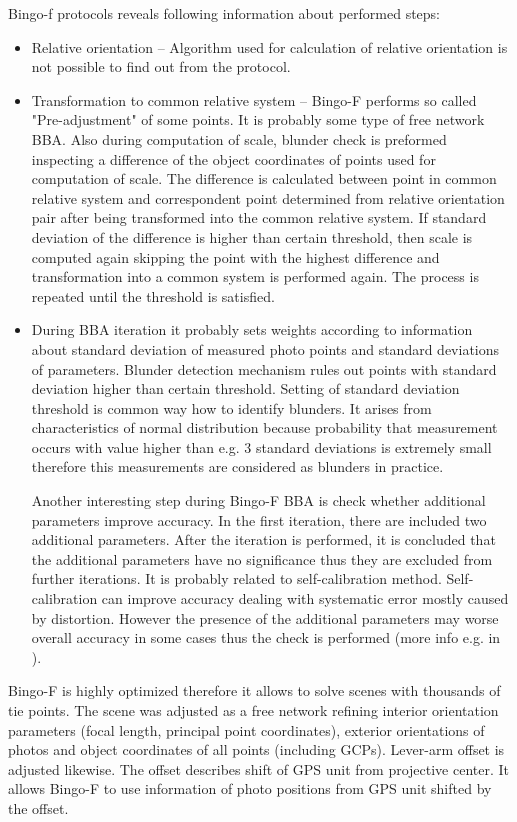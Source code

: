 \documentclass[a4paper,12pt]{article}
\begin{document}
Bingo-f protocols reveals following information about performed steps: 
\begin{itemize}
\item Relative orientation -- Algorithm used for calculation of relative orientation is not possible to find out from the protocol.  
\item Transformation to common relative system -- Bingo-F performs so called "Pre-adjustment" of some points. It is probably some type of free network 
BBA. Also during computation of scale, blunder check is preformed inspecting a difference of the object coordinates of points 
used for computation of scale. The difference is calculated between point in common relative system 
and correspondent point determined from relative orientation pair after being transformed into the common relative system.
If standard deviation of the difference is higher than certain threshold, then 
scale is computed again skipping the point with the highest difference and 
transformation into a common system is performed again.
The process is repeated  until  the threshold is satisfied.
\item During BBA iteration it probably sets weights according to information about standard deviation of measured photo points 
and standard deviations of parameters. 
Blunder detection mechanism rules out points with
standard deviation higher than certain threshold. Setting of standard deviation threshold  is common way how to identify 
blunders. It arises from characteristics of normal distribution because probability that measurement occurs with value 
 higher than e.g. 3 standard deviations is extremely small therefore this measurements are considered as blunders in practice.
 
 Another interesting step during Bingo-F BBA is check whether additional parameters improve accuracy. 
 In the first iteration, there are included two additional parameters. After 
 the iteration is performed, it is concluded that the additional parameters have no significance thus 
 they are excluded from further iterations. It is probably related to self-calibration 
 method. Self-calibration can improve accuracy dealing with systematic error mostly caused by 
 distortion. However the presence of the additional parameters may worse overall accuracy in some cases thus 
  the check is performed (more info e.g. in \cite{precision1980grunn}).
\end{itemize}

Bingo-F is highly optimized therefore it allows to solve scenes with thousands of tie points.
The scene was adjusted as a free network refining interior orientation parameters (focal length, principal point coordinates),
exterior orientations of photos and object coordinates of all points (including GCPs). Lever-arm offset is adjusted likewise.
The offset describes 
shift of GPS unit from projective center.  
It allows Bingo-F to use information of photo positions from GPS unit shifted by the offset.  
\end{document}
